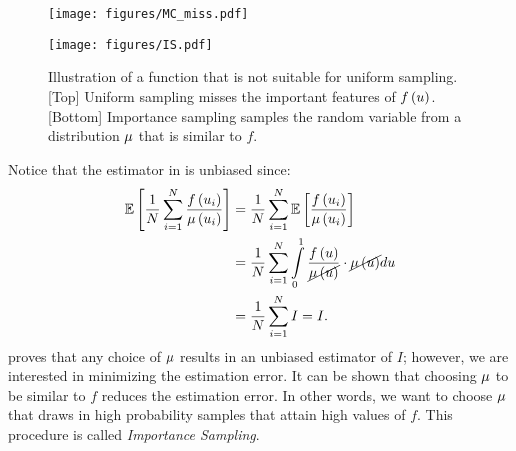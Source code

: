 \documentclass{article}
\begin{document}
\begin{figure}[t]
  \centering
  \begin{minipage}[b]{0.44\textwidth}
  \texttt{[image: figures/MC\_miss.pdf]}
  \end{minipage}
    \begin{minipage}[b]{0.44\textwidth}
  \texttt{[image: figures/IS.pdf]}
  \end{minipage}
    \caption{Illustration of a function that is not suitable for uniform sampling. [Top] Uniform sampling misses the important features of $f\left({u}\right)$. [Bottom] Importance sampling samples the random variable from a distribution $\mu$ that is similar to $f$. 
    }
    \label{fig:IS}
\end{figure}
Notice that the estimator in \eq{\ref{eq:IS_1d_estimator}} is unbiased since:
\begin{equation}
\label{eq:unbiasedness}
\begin{split}
\mathbb{E}\squarepar{\frac{1}{N}\sum_{\pathindex=1}^N{\frac{f\regpar{\mcpar_i}}{\ispdf\regpar{\mcpar_i}}}} & = \frac{1}{N}\sum_{\pathindex=1}^N{\mathbb{E}\squarepar{\frac{f\regpar{\mcpar_i}}{\ispdf\regpar{\mcpar_i}}}} \\
& = \frac{1}{N}\sum_{\pathindex=1}^N{\intop_0^1{\frac{f\regpar{\mcpar}}{\cancel{\ispdf\regpar{\mcpar}}}\cdot \cancel{\ispdf\regpar{\mcpar}}d\mcpar}} \\
& = \frac{1}{N}\sum_{\pathindex=1}^N{I} = I .
\end{split}
\end{equation}
\eq{\ref{eq:unbiasedness}} proves that any choice of $\mu$ results in an unbiased estimator of $I$; however, we are interested in minimizing the estimation error. It can be shown \citep{veach1997robust} that choosing $\mu$ to be similar to $f$ reduces the estimation error. In other words, we want to choose $\mu$ that draws in high probability samples that attain high values of $f$. This procedure is called \textit{Importance Sampling}.

\end{document}
